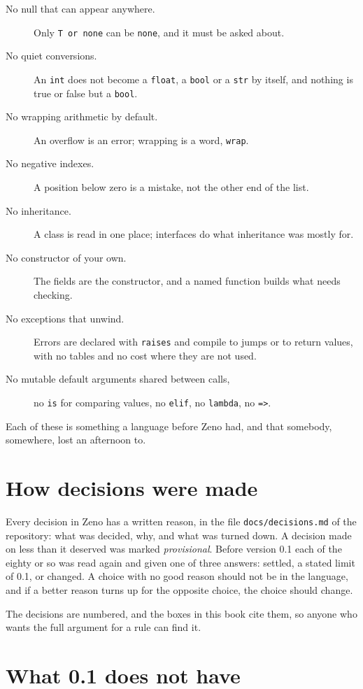 \begin{description}
\item[No null that can appear anywhere.] Only \verb|T or none| can be
  \verb|none|, and it must be asked about.
\item[No quiet conversions.] An \verb|int| does not become a
  \verb|float|, a \verb|bool| or a \verb|str| by itself, and nothing is
  true or false but a \verb|bool|.
\item[No wrapping arithmetic by default.] An overflow is an error;
  wrapping is a word, \verb|wrap|.
\item[No negative indexes.] A position below zero is a mistake, not the
  other end of the list.
\item[No inheritance.] A class is read in one place; interfaces do
  what inheritance was mostly for.
\item[No constructor of your own.] The fields are the constructor, and
  a named function builds what needs checking.
\item[No exceptions that unwind.] Errors are declared with
  \verb|raises| and compile to jumps or to return values, with no
  tables and no cost where they are not used.
\item[No mutable default arguments shared between calls,] no
  \verb|is| for comparing values, no \verb|elif|, no \verb|lambda|, no
  \verb|=>|.
\end{description}

Each of these is something a language before Zeno had, and that
somebody, somewhere, lost an afternoon to.

\section{How decisions were made}

Every decision in Zeno has a written reason, in the file
\verb|docs/decisions.md| of the repository: what was decided, why, and
what was turned down. A decision made on less than it deserved was
marked \emph{provisional}. Before version 0.1 each of the eighty or so
was read again and given one of three answers: settled, a stated limit
of 0.1, or changed. A choice with no good reason should not be in the
language, and if a better reason turns up for the opposite choice, the
choice should change.

The decisions are numbered, and the boxes in this book cite them, so
anyone who wants the full argument for a rule can find it.

\section{What 0.1 does not have}


